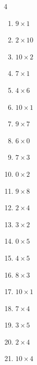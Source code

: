 \begin{multicols}{4}
\begin{enumerate}
  \item $9\times 1$
        \phantom{$=9$}

  \item $2\times 10$
        \phantom{$=20$}

  \item $10\times 2$
        \phantom{$=20$}

  \item $7\times 1$
        \phantom{$=7$}

  \item $4\times 6$
        \phantom{$=24$}

  \item $10\times 1$
        \phantom{$=10$}

  \item $9\times 7$
        \phantom{$=63$}

  \item $6\times 0$
        \phantom{$=0$}

  \item $7\times 3$
        \phantom{$=21$}

  \item $0\times 2$
        \phantom{$=0$}

  \item $9\times 8$
        \phantom{$=72$}

\columnbreak %

  \item $2\times 4$
        \phantom{$=8$}

  \item $3\times 2$
        \phantom{$=6$}

  \item $0\times 5$
        \phantom{$=0$}

  \item $4\times 5$
        \phantom{$=20$}

  \item $8\times 3$
        \phantom{$=24$}

  \item $10\times 1$
        \phantom{$=10$}

  \item $7\times 4$
        \phantom{$=28$}

  \item $3\times 5$
        \phantom{$=15$}

  \item $2\times 4$
        \phantom{$=8$}

  \item $10\times 4$
        \phantom{$=40$}


\end{enumerate}
\end{multicols}
